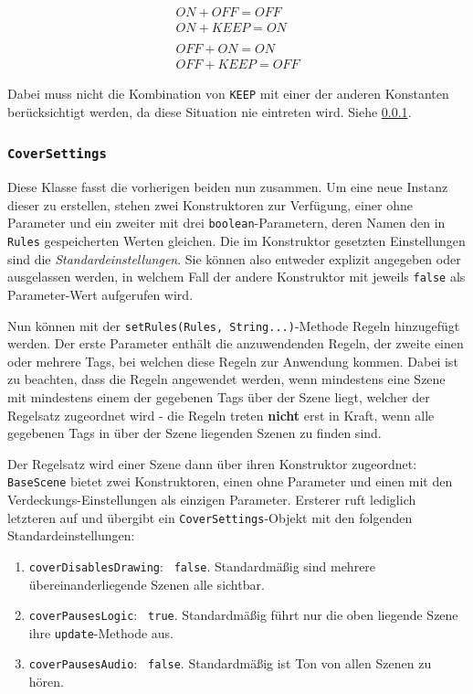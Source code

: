 \begin{sloppypar}
\begin{align*}
	ON + OFF = OFF\\
	ON + KEEP = ON\\
	\\
	OFF + ON = ON\\
	OFF + KEEP = OFF
\end{align*}

Dabei muss nicht die Kombination von \texttt{KEEP} mit einer der anderen
Konstanten berücksichtigt werden, da diese Situation nie eintreten wird.
Siehe \ref{programm:engine:szene:verdecken:CoverSettings}.


\subsubsection{\texttt{CoverSettings}} \label{programm:engine:szene:verdecken:CoverSettings}

Diese Klasse fasst die vorherigen beiden nun zusammen.
Um eine neue Instanz dieser zu erstellen, stehen zwei Konstruktoren zur Verfügung,
einer ohne Parameter und ein zweiter mit drei \texttt{boolean}-Parametern, deren
Namen den in \texttt{Rules} gespeicherten Werten gleichen. Die im Konstruktor
gesetzten Einstellungen sind die \textit{Standardeinstellungen}. Sie können also
entweder explizit angegeben oder ausgelassen werden, in welchem Fall der andere
Konstruktor mit jeweils \texttt{false} als Parameter-Wert aufgerufen wird.

Nun können mit der \texttt{setRules(Rules, String...)}-Methode Regeln hinzugefügt werden.
Der erste Parameter enthält die anzuwendenden Regeln, der zweite einen oder mehrere Tags,
bei welchen diese Regeln zur Anwendung kommen. Dabei ist zu beachten, dass die Regeln
angewendet werden, wenn mindestens eine Szene mit mindestens einem der gegebenen Tags
über der Szene liegt, welcher der Regelsatz zugeordnet wird - die Regeln treten \textbf{nicht}
erst in Kraft, wenn alle gegebenen Tags in über der Szene liegenden Szenen zu finden sind.

Der Regelsatz wird einer Szene dann über ihren Konstruktor zugeordnet: 
\texttt{BaseScene} bietet zwei Konstruktoren, einen ohne Parameter und einen
mit den Verdeckungs-Einstellungen als einzigen Parameter. Ersterer ruft lediglich
letzteren auf und übergibt ein \texttt{CoverSettings}-Objekt mit den folgenden
Standardeinstellungen:

\begin{enumerate}
	\item \texttt{coverDisablesDrawing}: \texttt{ false}. Standardmäßig sind mehrere
	      übereinanderliegende Szenen alle sichtbar.
	\item \texttt{coverPausesLogic}: \texttt{ true}. Standardmäßig führt nur die
	      oben liegende Szene ihre \texttt{update}-Methode aus.
	\item \texttt{coverPausesAudio}: \texttt{ false}. Standardmäßig ist Ton von allen Szenen zu hören.
\end{enumerate}


\end{sloppypar}
